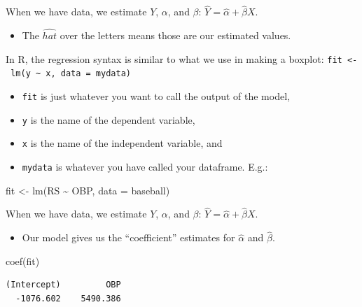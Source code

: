 \documentclass[
  letterpaper,
  DIV=11,
  numbers=noendperiod]{scrreprt}
\newenvironment{Shaded}{\begin{snugshade}}{\end{snugshade}}
\newcommand{\AttributeTok}[1]{\textcolor[rgb]{0.40,0.45,0.13}{#1}}
\newcommand{\FunctionTok}[1]{\textcolor[rgb]{0.28,0.35,0.67}{#1}}
\newcommand{\NormalTok}[1]{\textcolor[rgb]{0.00,0.23,0.31}{#1}}
\newcommand{\OtherTok}[1]{\textcolor[rgb]{0.00,0.23,0.31}{#1}}
\newcommand{\SpecialCharTok}[1]{\textcolor[rgb]{0.37,0.37,0.37}{#1}}
\providecommand{\tightlist}{%
  \setlength{\itemsep}{0pt}\setlength{\parskip}{0pt}}\usepackage{longtable,booktabs,array}
\begin{document}
When we have data, we estimate \(Y\), \(\alpha\), and \(\beta\):
\(\hat Y = \hat \alpha + \hat \beta X\).

\begin{itemize}
\tightlist
\item
  The \({\hat{hat}}\) over the letters means those are our estimated
  values.
\end{itemize}

In R, the regression syntax is similar to what we use in making a
boxplot:
\texttt{fit\ \textless{}-\ lm(y\ \textasciitilde{}\ x,\ data\ =\ mydata)}

\begin{itemize}
\tightlist
\item
  \texttt{fit} is just whatever you want to call the output of the
  model,
\item
  \texttt{y} is the name of the dependent variable,
\item
  \texttt{x} is the name of the independent variable, and
\item
  \texttt{mydata} is whatever you have called your dataframe. E.g.:
\end{itemize}

\begin{Shaded}
\begin{Highlighting}[]
\NormalTok{fit }\OtherTok{\textless{}{-}} \FunctionTok{lm}\NormalTok{(RS }\SpecialCharTok{\textasciitilde{}}\NormalTok{ OBP, }\AttributeTok{data =}\NormalTok{ baseball)}
\end{Highlighting}
\end{Shaded}

When we have data, we estimate \(Y\), \(\alpha\), and \(\beta\):
\(\hat Y = \hat \alpha + \hat \beta X\).

\begin{itemize}
\tightlist
\item
  Our model gives us the ``coefficient'' estimates for \(\hat \alpha\)
  and \(\hat \beta\).
\end{itemize}

\begin{Shaded}
\begin{Highlighting}[]
\FunctionTok{coef}\NormalTok{(fit)}
\end{Highlighting}
\end{Shaded}

\begin{verbatim}
(Intercept)         OBP 
  -1076.602    5490.386 
\end{verbatim}
\end{document}
